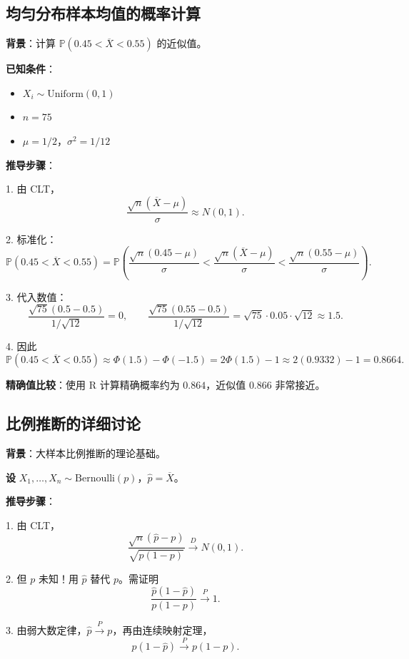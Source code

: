 \subsection{均匀分布样本均值的概率计算}\label{sec:uniform-mean-probability}

\textbf{背景}：计算 $\mathbb{P}(0.45 < \overline{X} < 0.55)$ 的近似值。

\textbf{已知条件}：
\begin{itemize}
\item $X_i \sim \mathrm{Uniform}(0,1)$
\item $n = 75$
\item $\mu = 1/2$，$\sigma^2 = 1/12$
\end{itemize}

\textbf{推导步骤}：

1. 由 CLT，
\[
\frac{\sqrt{n}(\overline{X} - \mu)}{\sigma} \approx N(0,1).
\]

2. 标准化：
\[
\mathbb{P}(0.45 < \overline{X} < 0.55) = \mathbb{P}\left(\frac{\sqrt{n}(0.45 - \mu)}{\sigma} < \frac{\sqrt{n}(\overline{X} - \mu)}{\sigma} < \frac{\sqrt{n}(0.55 - \mu)}{\sigma}\right).
\]

3. 代入数值：
\[
\frac{\sqrt{75}(0.5 - 0.5)}{1/\sqrt{12}} = 0,\qquad \frac{\sqrt{75}(0.55 - 0.5)}{1/\sqrt{12}} = \sqrt{75} \cdot 0.05 \cdot \sqrt{12} \approx 1.5.
\]

4. 因此
\[
\mathbb{P}(0.45 < \overline{X} < 0.55) \approx \Phi(1.5) - \Phi(-1.5) = 2\Phi(1.5) - 1 \approx 2(0.9332) - 1 = 0.8664.
\]

\textbf{精确值比较}：使用 R 计算精确概率约为 $0.864$，近似值 $0.866$ 非常接近。

\subsection{比例推断的详细讨论}\label{sec:proportion-inference}

\textbf{背景}：大样本比例推断的理论基础。

\textbf{设} $X_1, \ldots, X_n \sim \mathrm{Bernoulli}(p)$，$\widehat{p} = \overline{X}$。

\textbf{推导步骤}：

1. 由 CLT，
\[
\frac{\sqrt{n}(\widehat{p} - p)}{\sqrt{p(1-p)}} \xrightarrow{D} N(0,1).
\label{eq:proportion-clt-full}
\]

2. 但 $p$ 未知！用 $\widehat{p}$ 替代 $p$。需证明
\[
\frac{\widehat{p}(1 - \widehat{p})}{p(1-p)} \xrightarrow{P} 1.
\label{eq:proportion-ratio}
\]

3. 由弱大数定律，$\widehat{p} \xrightarrow{P} p$，再由连续映射定理，
\[
\widehat{p}(1 - \widehat{p}) \xrightarrow{P} p(1-p).
\]

